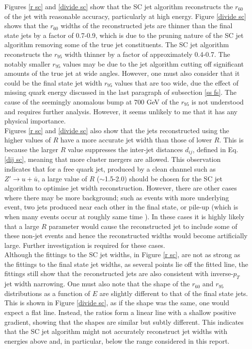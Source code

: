 \documentclass[a4paper,11pt, onecolumn]{article}
\begin{document}
 
  Figures \ref{r sc} and \ref{divide sc} show that the SC jet algorithm reconstructs the $r_{60}$ of the jet with reasonable accuracy, particularly at high energy. 
  Figure \ref{divide sc} shows that the $r_{60}$ widths of the reconstructed jets are thinner than the final state jets by a factor of 0.7-0.9, which is due to the 
  pruning nature of the SC jet algorithm removing some of the true jet constituents. The SC jet algorithm reconstructs the $r_{95}$ width
  thinner by a factor of approximately 0.4-0.7. The notably smaller $r_{95}$ values may be due to the jet algorithm cutting off 
  significant amounts of the true jet at wide angles.
  However, one must also consider that it could be the final state jet width $r_{95}$ values 
  that are too wide, due the effect of missing quark energy discussed in the last paragraph of subsection \ref{ss fs}. 
  The cause of the seemingly anomalous bump at $700$ GeV of the $r_{95}$ is not understood and requires further analysis. However, it seems unlikely to me that it has any
  physical importance. \\
  
  Figures \ref{r sc} and \ref{divide sc} also show that the jets reconstructed using the higher values of $R$ have a more accurate jet width than those of lower $R$. 
  This is because the larger $R$ value suppresses the inter-jet distances $d_{ij}$, defined in Eq. \eqref{dij sc}, meaning that more cluster 
  mergers are allowed. 
  This observation indicates that for a free quark jet, produced by a clean channel such as $Z' \to u + \bar{u}$, a large value of $R$ ($\sim$1.5-2.0)
  should be chosen for the SC jet algorithm to optimise jet width reconstruction.
  However, there are other cases where there may be more background; such as events with more underlying event, two jets produced near each other in the final state, 
  or pile-up (which is when many events occur at roughly same time \cite{pile-up}).
  In these cases it is highly likely that a large $R$ parameter would 
  cause the reconstructed jet to include some of these non-jet events and hence the reconstructed widths would become artificially large.
  Further investigation is required for these cases. \\

  Although the fittings to the SC jet widths, in Figure \ref{r sc}, are not as strong as the fittings to the final state jet widths, as several points lie off the
  fitted line, the fittings still show that the reconstructed jets are also consistent with inverse-$p_T$ jet width narrowing. One must also note that the shape of the $r_{60}$ 
  and $r_{95}$ distributions as a function of $E$ are slightly different to that of the final state jets. This is shown in Figure \ref{divide sc}, as if the shape was the
  same, one would expect a flat line. Instead, the ratios form a linear line with a shallow positive gradient, showing that the shapes are similar but subtly different.
  This indicates that the SC jet algorithm might not accurately reconstruct jet widths with energies above and, in particular, below the range considered in this report. 
\end{document}
